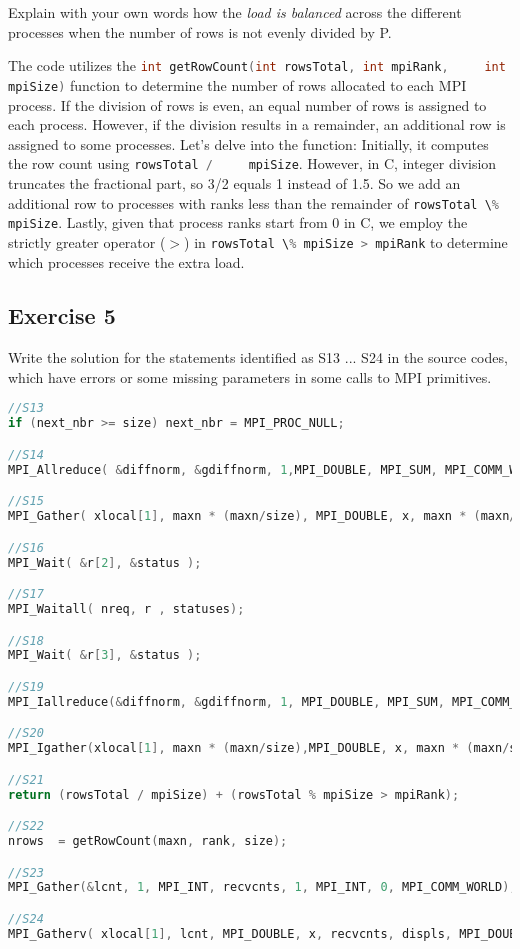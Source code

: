 \documentclass{article}
\newcommand{\incode}[1]{\lstinline[style=c,language=C]{#1}}
\begin{document}
    \begin{mdframed}
    Explain with your own words how the \textit{load is balanced} across the
    different processes when the number of rows is not evenly divided by P.
    \end{mdframed}

    The code utilizes the \incode{int getRowCount(int rowsTotal, int mpiRank,
    int mpiSize)} function to determine the number of rows allocated to each
    MPI process. If the division of rows is even, an equal number of rows is
    assigned to each process. However, if the division results in a remainder,
    an additional row is assigned to some processes. Let's delve into the
    function: Initially, it computes the row count using \incode{rowsTotal /
    mpiSize}.  However, in C, integer division truncates the fractional part,
    so 3/2 equals 1 instead of 1.5. So we add an additional row to processes
    with ranks less than the remainder of \incode{rowsTotal \% mpiSize}.
    Lastly, given that process ranks start from 0 in C, we employ the strictly
    greater operator ($>$) in \incode{rowsTotal \% mpiSize > mpiRank} to
    determine which processes receive the extra load.

    \subsection{Exercise 5}

    \begin{mdframed}
    Write the solution for the statements identified as S13 ... S24 in the
    source codes, which have errors or some missing parameters in some calls to
    MPI primitives.
    \end{mdframed}

    \begin{lstlisting}[style=c, language=C]
//S13
if (next_nbr >= size) next_nbr = MPI_PROC_NULL;

//S14
MPI_Allreduce( &diffnorm, &gdiffnorm, 1,MPI_DOUBLE, MPI_SUM, MPI_COMM_WORLD);

//S15
MPI_Gather( xlocal[1], maxn * (maxn/size), MPI_DOUBLE, x, maxn * (maxn/size), MPI_DOUBLE, 0, MPI_COMM_WORLD );

//S16
MPI_Wait( &r[2], &status );

//S17
MPI_Waitall( nreq, r , statuses);

//S18
MPI_Wait( &r[3], &status );

//S19
MPI_Iallreduce(&diffnorm, &gdiffnorm, 1, MPI_DOUBLE, MPI_SUM, MPI_COMM_WORLD, &r[0] );

//S20
MPI_Igather(xlocal[1], maxn * (maxn/size),MPI_DOUBLE, x, maxn * (maxn/size), MPI_DOUBLE, 0, MPI_COMM_WORLD, &r[0] );

//S21   
return (rowsTotal / mpiSize) + (rowsTotal % mpiSize > mpiRank);

//S22
nrows  = getRowCount(maxn, rank, size);

//S23
MPI_Gather(&lcnt, 1, MPI_INT, recvcnts, 1, MPI_INT, 0, MPI_COMM_WORLD);

//S24
MPI_Gatherv( xlocal[1], lcnt, MPI_DOUBLE, x, recvcnts, displs, MPI_DOUBLE,0, MPI_COMM_WORLD);
    \end{lstlisting}
\end{document}
